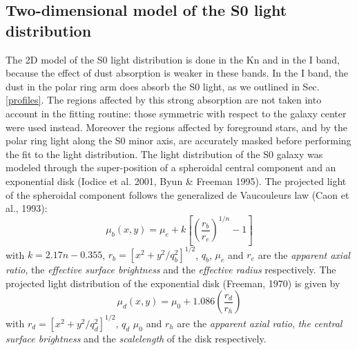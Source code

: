 \documentclass[preprint]{aastex}
\begin{document}
\subsection{Two-dimensional model of the S0 light distribution}
\label{model1}
The 2D model of the S0 light distribution is done in the Kn and 
in the I band, because the  effect of dust absorption is weaker 
in these bands.
In the I band, the dust in the polar ring arm
does absorb the S0 light, as we outlined in Sec.\ref{profiles}.
The regions affected by this strong absorption are not taken into account
in the fitting routine: those symmetric with respect to the galaxy center were
used instead. Moreover the regions affected by 
foreground stars, and by the polar ring light along the S0 minor axis,  
are accurately masked before performing the fit to the
light distribution.
The light distribution of the S0 galaxy was modeled
through the super-position of a spheroidal central component and an
exponential disk (Iodice et al. 2001, Byun \& Freeman 1995). 
The projected light of the spheroidal component follows the generalized 
de Vaucouleurs law (Caon et al., 1993):
\begin{equation}
\mu_{b}(x,y)=\mu_{e}+k \left[\left(\frac{r_{b}}{r_{e}}\right)^{1/n}-1
\right]
\end{equation}
with $k=2.17n-0.355$, $r_{b}=\left[{x^{2}+y^{2}/q_b^{2}}\right]^{1/2}$, 
$q_{b}$, $\mu_{e}$ and $r_{e}$ are the
{\it apparent axial ratio}, the
{\it effective surface brightness} and the {\it effective radius}
respectively. 
The projected light distribution of the exponential disk (Freeman, 1970) 
is given by
\begin{equation}
\mu_{d}(x,y)=\mu_{0}+1.086\left(\frac{r_{d}}{r_{h}}\right)
\end{equation}
with $r_{d}=\left[{x^{2}+y^{2}/q_d^{2}}\right]^{1/2}$, $q_{d}$
$\mu_{0}$ and $r_{h}$ are the {\it apparent axial ratio},
{\it the central surface brightness} and the
{\it scalelength} of the disk respectively.
\end{document}

